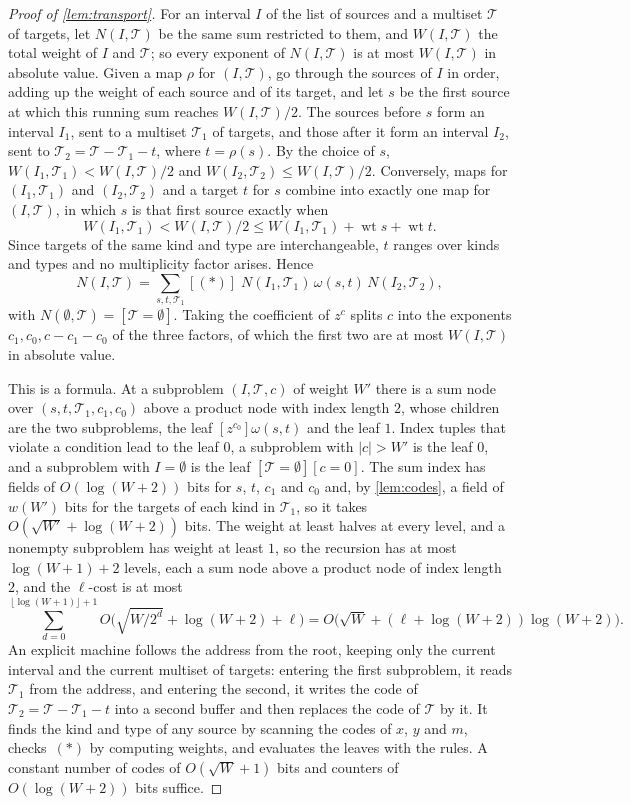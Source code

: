 \documentclass[11pt]{article}
\theoremstyle{definition}
\theoremstyle{definition}
\theoremstyle{remark}
\newcommand{\wt}{\operatorname{wt}}
\begin{document}
\begin{proof}[Proof of \cref{lem:transport}]
For an interval $I$ of the list of sources and a multiset $\mathcal T$ of targets, let $N(I,\mathcal T)$ be the same sum restricted to them, and $W(I,\mathcal T)$ the total weight of $I$ and $\mathcal T$; so every exponent of $N(I,\mathcal T)$ is at most $W(I,\mathcal T)$ in absolute value. Given a map $\rho$ for $(I,\mathcal T)$, go through the sources of $I$ in order, adding up the weight of each source and of its target, and let $s$ be the first source at which this running sum reaches $W(I,\mathcal T)/2$. The sources before $s$ form an interval $I_1$, sent to a multiset $\mathcal T_1$ of targets, and those after it form an interval $I_2$, sent to $\mathcal T_2=\mathcal T-\mathcal T_1-t$, where $t=\rho(s)$. By the choice of $s$, $W(I_1,\mathcal T_1)<W(I,\mathcal T)/2$ and $W(I_2,\mathcal T_2)\le W(I,\mathcal T)/2$. Conversely, maps for $(I_1,\mathcal T_1)$ and $(I_2,\mathcal T_2)$ and a target $t$ for $s$ combine into exactly one map for $(I,\mathcal T)$, in which $s$ is that first source exactly when
\[
W(I_1,\mathcal T_1)<W(I,\mathcal T)/2\le W(I_1,\mathcal T_1)+\wt s+\wt t.\tag{$*$}
\]
Since targets of the same kind and type are interchangeable, $t$ ranges over kinds and types and no multiplicity factor arises. Hence
\[
N(I,\mathcal T)=\sum_{s,t,\mathcal T_1}[(*)]\;N(I_1,\mathcal T_1)\,\omega(s,t)\,N(I_2,\mathcal T_2),
\]
with $N(\emptyset,\mathcal T)=[\mathcal T=\emptyset]$. Taking the coefficient of $z^c$ splits $c$ into the exponents $c_1,c_0,c-c_1-c_0$ of the three factors, of which the first two are at most $W(I,\mathcal T)$ in absolute value.

This is a formula. At a subproblem $(I,\mathcal T,c)$ of weight $W'$ there is a sum node over $(s,t,\mathcal T_1,c_1,c_0)$ above a product node with index length $2$, whose children are the two subproblems, the leaf $[z^{c_0}]\omega(s,t)$ and the leaf $1$. Index tuples that violate a condition lead to the leaf $0$, a subproblem with $|c|>W'$ is the leaf $0$, and a subproblem with $I=\emptyset$ is the leaf $[\mathcal T=\emptyset][c=0]$. The sum index has fields of $O(\log(W+2))$ bits for $s$, $t$, $c_1$ and $c_0$ and, by \cref{lem:codes}, a field of $w(W')$ bits for the targets of each kind in $\mathcal T_1$, so it takes $O(\sqrt{W'}+\log(W+2))$ bits. The weight at least halves at every level, and a nonempty subproblem has weight at least $1$, so the recursion has at most $\log(W+1)+2$ levels, each a sum node above a product node of index length $2$, and the $\ell$-cost is at most
\[
\sum_{d=0}^{\lfloor\log(W+1)\rfloor+1}O\bigl(\sqrt{W/2^d}+\log(W+2)+\ell\bigr)=O\bigl(\sqrt W+(\ell+\log(W+2))\log(W+2)\bigr).
\]
An explicit machine follows the address from the root, keeping only the current interval and the current multiset of targets: entering the first subproblem, it reads $\mathcal T_1$ from the address, and entering the second, it writes the code of $\mathcal T_2=\mathcal T-\mathcal T_1-t$ into a second buffer and then replaces the code of $\mathcal T$ by it. It finds the kind and type of any source by scanning the codes of $x$, $y$ and $m$, checks~$(*)$ by computing weights, and evaluates the leaves with the rules. A constant number of codes of $O(\sqrt W+1)$ bits and counters of $O(\log(W+2))$ bits suffice.
\end{proof}
\end{document}
